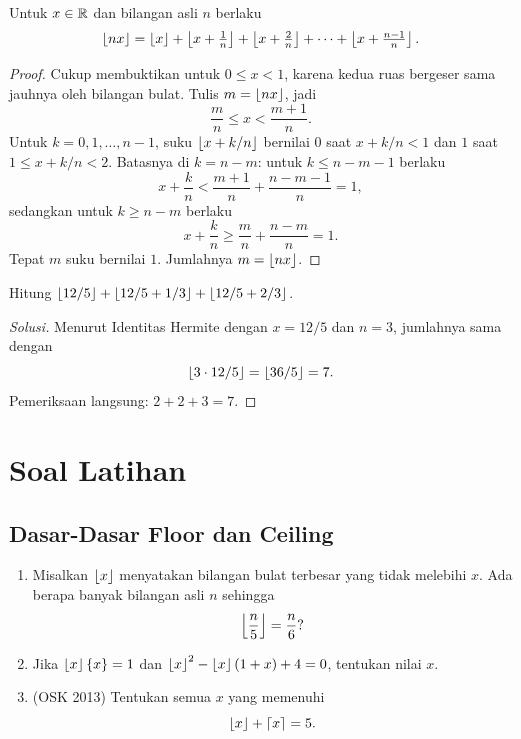 \documentclass[12pt]{scrartcl}
\providecommand{\sumber}[1]{(#1)}
\begin{document}
\begin{theorem}
Untuk $x \in \mathbb R$ dan bilangan asli $n$ berlaku
\[ \left\lfloor nx \right\rfloor = \left\lfloor x \right\rfloor + \left\lfloor x + \tfrac1n \right\rfloor
+ \left\lfloor x + \tfrac2n \right\rfloor + \dots + \left\lfloor x + \tfrac{n-1}{n} \right\rfloor. \]
\end{theorem}
\begin{proof}
Cukup membuktikan untuk $0 \le x < 1$,
karena kedua ruas bergeser sama jauhnya oleh bilangan bulat.
Tulis $m = \left\lfloor nx \right\rfloor$, jadi
\[ \frac{m}{n} \le x < \frac{m+1}{n}. \]
Untuk $k = 0, 1, \dots, n-1$, suku $\left\lfloor x + k/n \right\rfloor$
bernilai $0$ saat $x + k/n < 1$ dan $1$ saat $1 \le x + k/n < 2$.
Batasnya di $k = n - m$: untuk $k \le n - m - 1$ berlaku
\[ x + \frac{k}{n} < \frac{m+1}{n} + \frac{n-m-1}{n} = 1, \]
sedangkan untuk $k \ge n - m$ berlaku
\[ x + \frac{k}{n} \ge \frac{m}{n} + \frac{n-m}{n} = 1. \]
Tepat $m$ suku bernilai $1$. Jumlahnya $m = \left\lfloor nx \right\rfloor$.
\end{proof}

\begin{example}
Hitung $\left\lfloor 12/5 \right\rfloor + \left\lfloor 12/5 + 1/3 \right\rfloor + \left\lfloor 12/5 + 2/3 \right\rfloor$.
\end{example}
\begin{proof}[Solusi]
Menurut Identitas Hermite dengan $x = 12/5$ dan $n = 3$,
jumlahnya sama dengan
\[ \left\lfloor 3 \cdot 12/5 \right\rfloor = \left\lfloor 36/5 \right\rfloor = 7. \]
Pemeriksaan langsung: $2 + 2 + 3 = 7$.
\end{proof}

\section{Soal Latihan}

\subsection{Dasar-Dasar Floor dan Ceiling}
\begin{enumerate}

	\item
	Misalkan $\left\lfloor x \right\rfloor$ menyatakan bilangan bulat terbesar yang tidak melebihi $x$.
	Ada berapa banyak bilangan asli $n$ sehingga
	\[ \left\lfloor \frac{n}{5} \right\rfloor = \frac{n}{6} ? \]

	\item
	Jika $\left\lfloor x \right\rfloor\{x\} = 1$ dan
	$\left\lfloor x \right\rfloor^2 - \left\lfloor x \right\rfloor(1+x) + 4 = 0$,
	tentukan nilai $x$.

	\item \sumber{OSK 2013}
	Tentukan semua $x$ yang memenuhi
	\[ \left\lfloor x \right\rfloor + \left\lceil x \right\rceil = 5. \]

\end{enumerate}
\end{document}
